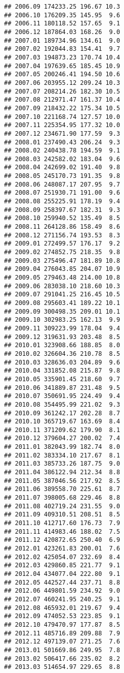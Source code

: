 \documentclass[]{article}
\begin{document}
\begin{verbatim}
## 2006.09 174233.25 196.67 10.3
## 2006.10 176209.35 145.95  9.6
## 2006.11 180118.52 157.65  9.1
## 2006.12 187864.03 168.26  9.0
## 2007.01 189734.96 134.61  9.0
## 2007.02 192044.83 154.41  9.7
## 2007.03 194873.23 170.74 10.4
## 2007.04 197639.65 185.45 10.9
## 2007.05 200246.41 194.50 10.6
## 2007.06 203955.12 209.24 10.3
## 2007.07 208214.26 182.30 10.5
## 2007.08 212971.47 161.37 10.4
## 2007.09 218432.22 175.34 10.5
## 2007.10 221168.74 127.57 10.0
## 2007.11 225354.95 177.32 10.0
## 2007.12 234671.90 177.59  9.3
## 2008.01 237490.43 206.24  9.3
## 2008.02 240438.78 194.59  9.1
## 2008.03 242582.02 183.04  9.6
## 2008.04 242699.02 191.40  9.8
## 2008.05 245170.73 191.35  9.8
## 2008.06 248087.17 207.95  9.7
## 2008.07 251930.71 191.00  9.6
## 2008.08 255225.91 178.19  9.4
## 2008.09 258397.67 182.31  9.3
## 2008.10 259940.52 135.49  8.5
## 2008.11 264128.86 158.49  8.6
## 2008.12 271156.74 193.53  8.3
## 2009.01 272499.57 176.17  9.2
## 2009.02 274852.75 218.35  9.8
## 2009.03 275496.47 181.89 10.8
## 2009.04 276043.85 204.07 10.9
## 2009.05 279463.48 214.00 10.8
## 2009.06 283038.10 218.60 10.3
## 2009.07 291041.25 216.45 10.5
## 2009.08 295603.41 189.22 10.1
## 2009.09 300498.35 209.01 10.1
## 2009.10 302983.25 162.13  9.9
## 2009.11 309223.99 178.04  9.4
## 2009.12 319631.93 203.48  8.5
## 2010.01 323908.66 188.85  8.0
## 2010.02 326604.36 210.78  8.5
## 2010.03 328636.03 204.89  9.6
## 2010.04 331852.08 215.87  9.8
## 2010.05 335901.45 218.60  9.7
## 2010.06 341889.87 231.48  9.5
## 2010.07 350691.95 224.49  9.4
## 2010.08 354495.99 221.02  9.3
## 2010.09 361242.17 202.28  8.7
## 2010.10 365719.67 163.69  8.4
## 2010.11 371209.62 179.90  8.1
## 2010.12 379604.27 200.02  7.4
## 2011.01 382043.99 182.74  8.0
## 2011.02 383334.10 217.67  8.1
## 2011.03 385733.26 187.75  9.0
## 2011.04 386122.94 212.34  8.8
## 2011.05 387046.56 217.92  8.5
## 2011.06 389558.70 225.61  8.7
## 2011.07 398005.68 229.46  8.8
## 2011.08 402719.24 231.55  9.0
## 2011.09 409310.51 208.51  8.5
## 2011.10 412717.60 176.73  7.9
## 2011.11 414983.46 188.02  7.5
## 2011.12 420872.65 250.40  6.9
## 2012.01 423261.83 200.01  7.6
## 2012.02 425054.07 232.69  8.4
## 2012.03 429860.85 221.77  9.1
## 2012.04 434077.04 222.80  9.1
## 2012.05 442527.44 237.71  8.8
## 2012.06 449801.59 234.92  9.0
## 2012.07 460241.95 240.25  9.1
## 2012.08 465932.01 219.67  9.4
## 2012.09 474052.53 223.85  9.1
## 2012.10 479470.97 177.87  8.5
## 2012.11 485716.89 209.88  7.9
## 2012.12 497139.07 271.25  7.6
## 2013.01 501669.86 249.95  7.8
## 2013.02 506417.66 235.02  8.2
## 2013.03 514654.97 229.65  8.8

\end{verbatim}
\end{document}
